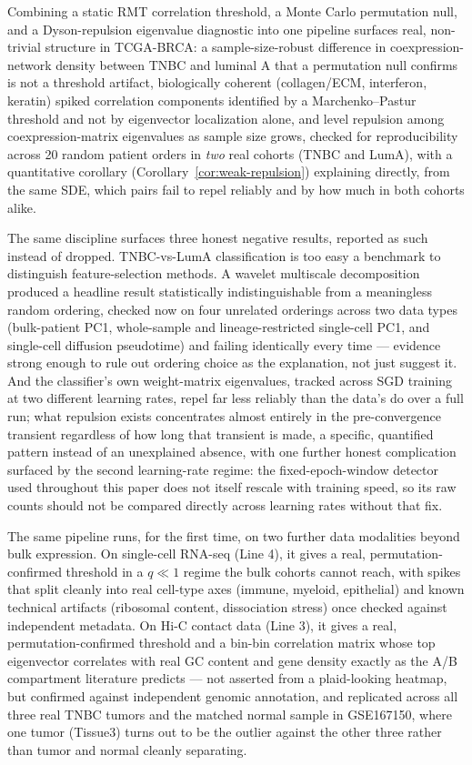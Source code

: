 \documentclass[11pt]{article}
\begin{document}
Combining a static RMT correlation threshold, a Monte Carlo permutation
null, and a Dyson-repulsion eigenvalue diagnostic into one pipeline
surfaces real, non-trivial structure in TCGA-BRCA: a sample-size-robust
difference in coexpression-network density between TNBC and luminal A
that a permutation null confirms is not a threshold artifact,
biologically coherent (collagen/ECM, interferon, keratin) spiked
correlation components identified by a Marchenko--Pastur threshold and
not by eigenvector localization alone, and level repulsion among
coexpression-matrix eigenvalues as sample size grows, checked for
reproducibility across 20 random patient orders in \emph{two} real
cohorts (TNBC and LumA), with a quantitative corollary
(Corollary~\ref{cor:weak-repulsion}) explaining directly, from the same
SDE, which pairs fail to repel reliably and by how much in both cohorts
alike.

The same discipline surfaces three honest negative results, reported
as such instead of dropped. TNBC-vs-LumA classification is too easy a
benchmark to distinguish feature-selection methods. A wavelet
multiscale decomposition produced a headline result statistically
indistinguishable from a meaningless random ordering, checked now on
four unrelated orderings across two data types (bulk-patient PC1,
whole-sample and lineage-restricted single-cell PC1, and single-cell
diffusion pseudotime) and failing identically every time --- evidence
strong enough to rule out ordering choice as the explanation, not just
suggest it. And the classifier's own weight-matrix eigenvalues, tracked
across SGD training at two different learning rates, repel far less
reliably than the data's do over a full run; what repulsion exists
concentrates almost entirely in the pre-convergence transient
regardless of how long that transient is made, a specific, quantified
pattern instead of an unexplained absence, with one further honest
complication surfaced by the second learning-rate regime: the
fixed-epoch-window detector used throughout this paper does not itself
rescale with training speed, so its raw counts should not be compared
directly across learning rates without that fix.

The same pipeline runs, for the first time, on two further data
modalities beyond bulk expression. On single-cell RNA-seq (Line 4), it
gives a real, permutation-confirmed threshold in a $q\ll1$ regime the
bulk cohorts cannot reach, with spikes that split cleanly into real
cell-type axes (immune, myeloid, epithelial) and known technical
artifacts (ribosomal content, dissociation stress) once checked against
independent metadata. On Hi-C contact data (Line 3), it gives a real,
permutation-confirmed threshold and a bin-bin
correlation matrix whose top eigenvector correlates with real GC
content and gene density exactly as the A/B compartment literature
predicts --- not asserted from a plaid-looking heatmap, but confirmed
against independent genomic annotation, and replicated across all three
real TNBC tumors and the matched normal sample in GSE167150, where one
tumor (Tissue3) turns out to be the outlier against the other three
rather than tumor and normal cleanly separating.
\end{document}
